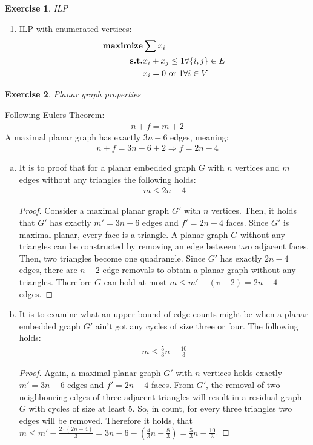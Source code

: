 \documentclass[a4paper,12pt,headsepline]{scrartcl}
\newtheorem{aufgabe}{Exercise}
\begin{document}
\begin{aufgabe}ILP
\end{aufgabe}
\begin{enumerate}
	\item ILP with enumerated vertices:
	\begin{align*}
		\textbf{\text{maximize}}& \sum x_i\\
		\textbf{\text{s.t.}}& x_i + x_j \leq 1 \forall \{i,j\}\in E\\
		& x_i = 0 \text{ or } 1 \forall i \in V
	\end{align*}
\end{enumerate}
\newpage
\begin{aufgabe}Planar graph properties
\end{aufgabe}
Following Eulers Theorem:
\begin{align*}
n + f = m + 2
\end{align*}
A maximal planar graph has exactly $3n-6$ edges, meaning:
\begin{align*}
n + f = 3n-6 + 2   \Rightarrow f = 2n-4
\end{align*}
\begin{enumerate}[a)]
	\item It is to proof that for a planar embedded graph $G$ with $n$ vertices and $m$ edges without any triangles the following holds:
	\begin{align*}
		m \leq 2n-4
	\end{align*}
	\begin{proof}
		Consider a maximal planar graph $G'$ with $n$ vertices. Then, it holds that $G'$ has exactly $m' = 3n-6$ edges and $f' = 2n-4$ faces. Since $G'$ is maximal planar, every face is a triangle. A planar graph $G$ without any triangles can be constructed by removing an edge between two adjacent faces. Then, two triangles become one quadrangle. Since $G'$ has exactly $2n-4$ edges, there are $n-2$ edge removals to obtain a planar graph without any triangles. Therefore $G$ can hold at most $m \leq m' - (v-2) = 2n -4$ edges.
	\end{proof}
	\item It is to examine what an upper bound of edge counts might be when a planar embedded graph $G'$ ain't got any cycles of size three or four. The following holds:
	\begin{align*}
		m \leq \frac{5}{3}n - \frac{10}{3}
	\end{align*}
	\begin{proof}
		Again, a maximal planar graph $G'$ with $n$ vertices holds exactly $m' = 3n-6$ edges and $f' = 2n-4$ faces. From $G'$, the removal of two neighbouring edges of three adjacent triangles will result in a residual graph $G$ with cycles of size at least 5. So, in count, for every three triangles two edges will be removed. Therefore it holds, that $m \leq m' - \frac{2\cdot (2n-4)}{3} = 3n-6 - (\frac{4}{3}n - \frac{8}{3}) = \frac{5}{3}n - \frac{10}{3}$.
	\end{proof}
\end{enumerate}
\end{document}

